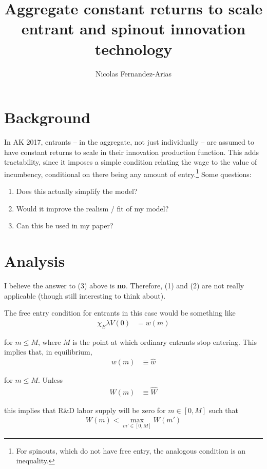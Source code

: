 \documentclass[11pt,english]{article}
\theoremstyle{remark}
\begin{document}
	
\title{Aggregate constant returns to scale entrant and spinout innovation technology}
\author{Nicolas Fernandez-Arias}
\maketitle

\section{Background}

In AK 2017, entrants -- in the aggregate, not just individually -- are assumed to have constant returns to scale in their innovation production function. This adds tractability, since it imposes a simple condition relating the wage to the value of incumbency, conditional on there being any amount of entry.\footnote{For spinouts, which do not have free entry, the analogous condition is an inequality.} Some questions:

\begin{enumerate}
	\item Does this actually simplify the model?
	\item Would it improve the realism / fit of my model?
	\item Can this be used in my paper?
\end{enumerate}

\section{Analysis}

I believe the answer to (3) above is \textbf{no}. Therefore, (1) and (2) are not really applicable (though still interesting to think about).

The free entry condition for entrants in this case would be something like
\begin{align*}
	\chi_E \lambda V(0) &= w(m)
\end{align*}

for $m \le M$, where $M$ is the point at which ordinary entrants stop entering. This implies that, in equilibrium, 
\begin{align*}
	w(m) &\equiv \hat{w}
\end{align*}

for $m \le M$. Unless
\begin{align*}
	W(m) &\equiv \hat{W}
\end{align*}

this implies that R\&D labor supply will be zero for $m \in [0,M]$ such that 
\begin{align*}
	W(m) < \max_{m' \in [0,M]} W(m')
\end{align*}
\end{document}
